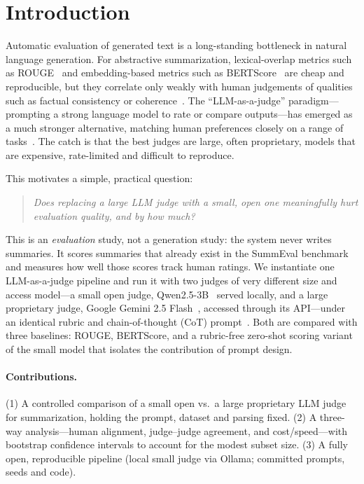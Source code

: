 \documentclass[runningheads]{llncs}
\begin{document}
\section{Introduction}

Automatic evaluation of generated text is a long-standing bottleneck in natural
language generation. For abstractive summarization, lexical-overlap metrics such as
ROUGE~\cite{lin2004rouge} and embedding-based metrics such as
BERTScore~\cite{zhang2020bertscore} are cheap and reproducible, but they correlate
only weakly with human judgements of qualities such as factual consistency or
coherence~\cite{fabbri2021summeval}. The ``LLM-as-a-judge'' paradigm---prompting a
strong language model to rate or compare outputs---has emerged as a much stronger
alternative, matching human preferences closely on a range of
tasks~\cite{zheng2023judging,liu2023geval,fu2023gptscore}. The catch is that the
best judges are large, often proprietary, models that are expensive, rate-limited
and difficult to reproduce.

This motivates a simple, practical question:

\begin{quote}
\emph{Does replacing a large LLM judge with a small, open one meaningfully hurt
evaluation quality, and by how much?}
\end{quote}

This is an \emph{evaluation} study, not a generation study: the system never writes
summaries. It scores summaries that already exist in the SummEval
benchmark~\cite{fabbri2021summeval} and measures how well those scores track human
ratings. We instantiate one LLM-as-a-judge pipeline and run it with two judges of
very different size and access model---a small open judge, Qwen2.5-3B~\cite{qwen2025}
served locally, and a large proprietary judge, Google Gemini 2.5
Flash~\cite{gemini2024}, accessed through its API---under an identical rubric and
chain-of-thought (CoT) prompt~\cite{wei2022chain}. Both are compared with
three baselines: ROUGE, BERTScore, and a rubric-free zero-shot scoring variant of
the small model that isolates the contribution of prompt design.

\paragraph{Contributions.} (1) A controlled comparison of a small open vs.\ a large
proprietary LLM judge for summarization, holding the prompt, dataset and parsing fixed. (2) A
three-way analysis---human alignment, judge--judge agreement, and cost/speed---with
bootstrap confidence intervals to account for the modest subset size. (3) A fully
open, reproducible pipeline (local small judge via Ollama; committed prompts, seeds
and code).
\end{document}

